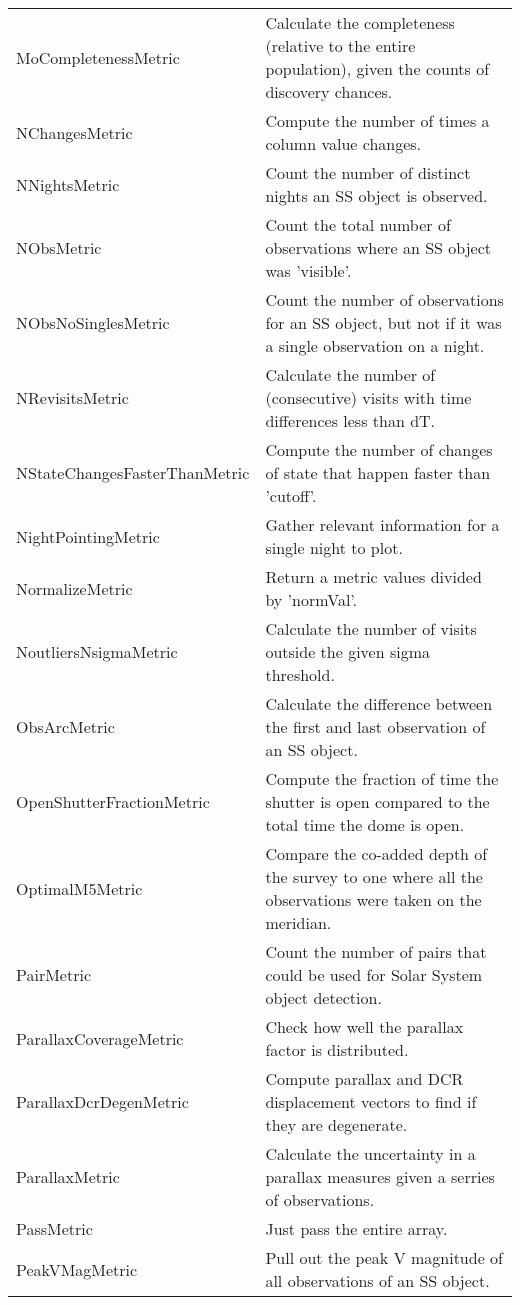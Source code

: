 \begin{table}
\begin{tabular}{ll}
 MoCompletenessMetric &  Calculate the completeness (relative to the entire population), given the counts of discovery chances. \\
 NChangesMetric &  Compute the number of times a column value changes. \\
 NNightsMetric &  Count the number of distinct nights an SS object is observed. \\
 NObsMetric &  Count the total number of observations where an SS object was 'visible'. \\
 NObsNoSinglesMetric &  Count the number of observations for an SS object, but not if it was a single observation on a night. \\
 NRevisitsMetric &  Calculate the number of (consecutive) visits with time differences less than dT. \\
 NStateChangesFasterThanMetric &  Compute the number of changes of state that happen faster than 'cutoff'. \\
 NightPointingMetric &  Gather relevant information for a single night to plot. \\
 NormalizeMetric &  Return a metric values divided by 'normVal'. \\
 NoutliersNsigmaMetric &  Calculate the number of visits outside the given sigma threshold. \\
 ObsArcMetric &  Calculate the difference between the first and last observation of an SS object. \\
 OpenShutterFractionMetric &  Compute the fraction of time the shutter is open compared to the total time the dome is open. \\
 OptimalM5Metric &  Compare the co-added depth of the survey to one where all the observations were taken on the meridian. \\
 PairMetric &  Count the number of pairs that could be used for Solar System object detection. \\
 ParallaxCoverageMetric &  Check how well the parallax factor is distributed. \\
 ParallaxDcrDegenMetric &  Compute parallax and DCR displacement vectors to find if they are degenerate. \\
 ParallaxMetric &  Calculate the uncertainty in a parallax measures given a serries of observations. \\
 PassMetric &  Just pass the entire array. \\
 PeakVMagMetric &  Pull out the peak V magnitude of all observations of an SS object. \\

\end{tabular}
\end{table}
